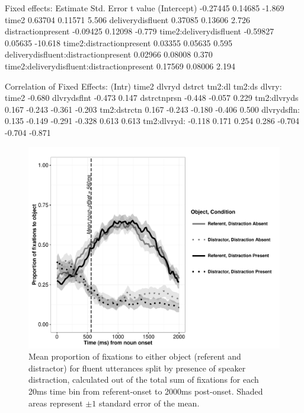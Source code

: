 \documentclass[a4paper,man,natbib]{apa6}
\begin{document}
Fixed effects:
                                           Estimate Std. Error t value
(Intercept)                                -0.27445    0.14685  -1.869
time2                                       0.63704    0.11571   5.506
deliverydisfluent                           0.37085    0.13606   2.726
distractionpresent                         -0.09425    0.12098  -0.779
time2:deliverydisfluent                    -0.59827    0.05635 -10.618
time2:distractionpresent                    0.03355    0.05635   0.595
deliverydisfluent:distractionpresent        0.02966    0.08008   0.370
time2:deliverydisfluent:distractionpresent  0.17569    0.08006   2.194

Correlation of Fixed Effects:
            (Intr) time2  dlvryd dstrct tm2:dl tm2:ds dlvry:
time2       -0.680                                          
dlvrydsflnt -0.473  0.147                                   
dstrctnprsn -0.448 -0.057  0.229                            
tm2:dlvryds  0.167 -0.243 -0.361 -0.203                     
tm2:dstrctn  0.167 -0.243 -0.180 -0.406  0.500              
dlvrydsfln:  0.135 -0.149 -0.291 -0.328  0.613  0.613       
tm2:dlvryd: -0.118  0.171  0.254  0.286 -0.704 -0.704 -0.871
\fi


\begin{figure}[Ht]
  \centering
	\includegraphics[width=\linewidth]{v2_eyef.pdf}
  \caption{Mean proportion of fixations to either object (referent and distractor) for fluent utterances split by presence of speaker distraction, calculated out of the total sum of fixations for each 20ms time bin from referent-onset to 2000ms post-onset. Shaded areas represent $\pm 1$ standard error of the mean.}
  \label{fig:flueye}
\end{figure}
\end{document}
